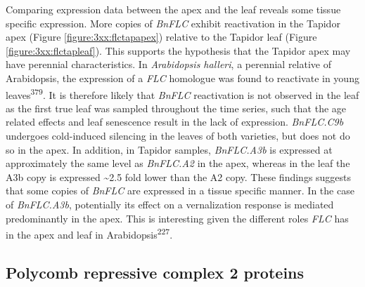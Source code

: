 \documentclass[12pt,]{book}
\begin{document}
Comparing expression data between the apex and the leaf reveals some
tissue specific expression. More copies of \emph{BnFLC} exhibit
reactivation in the Tapidor apex (Figure \ref{figure:3xx:flctapapex})
relative to the Tapidor leaf (Figure \ref{figure:3xx:flctapleaf}). This
supports the hypothesis that the Tapidor apex may have perennial
characteristics. In \emph{Arabidopsis halleri}, a perennial relative of
Arabidopsis, the expression of a \emph{FLC} homologue was found to
reactivate in young leaves\textsuperscript{379}. It is therefore likely
that \emph{BnFLC} reactivation is not observed in the leaf as the first
true leaf was sampled throughout the time series, such that the age
related effects and leaf senescence result in the lack of expression.
\emph{BnFLC.C9b} undergoes cold-induced silencing in the leaves of both
varieties, but does not do so in the apex. In addition, in Tapidor
samples, \emph{BnFLC.A3b} is expressed at approximately the same level
as \emph{BnFLC.A2} in the apex, whereas in the leaf the A3b copy is
expressed \textasciitilde{}2.5 fold lower than the A2 copy. These
findings suggests that some copies of \emph{BnFLC} are expressed in a
tissue specific manner. In the case of \emph{BnFLC.A3b}, potentially its
effect on a vernalization response is mediated predominantly in the
apex. This is interesting given the different roles \emph{FLC} has in
the apex and leaf in Arabidopsis\textsuperscript{227}.

\subsection{Polycomb repressive complex 2
proteins}\label{section:winter:prc2}
\end{document}
